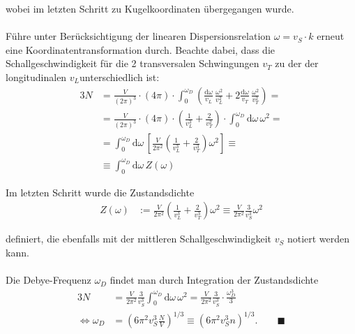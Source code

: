 \documentclass{article}
\newcommand{\diff}{\mathrm{d}}
\newcommand{\lr}[1]{\left(#1\right)}
\newcommand{\lreck}[1]{\left[#1\right]}
\begin{document}
{	wobei im letzten Schritt zu Kugelkoordinaten übergegangen wurde.\\
	\\
	Führe unter Berücksichtigung der linearen Dispersionsrelation $\omega = v_S \cdot k$ erneut eine Koordinatentransformation durch. Beachte dabei, dass die Schallgeschwindigkeit für die 2 transversalen Schwingungen $v_T$ zu der der longitudinalen $v_L$unterschiedlich ist:
		\begin{align*}
			3N &= \frac{V}{(2\pi)^3} \cdot (4\pi) \cdot \int_0^{\omega_D} \lr{ \frac{\diff\omega}{v_L} \, \frac{\omega^2}{v_L^2} + 2 \frac{\diff\omega}{v_T} \, \frac{\omega^2}{v_T^2} } = \\
			&= \frac{V}{(2\pi)^3} \cdot (4\pi) \cdot \lr{ \frac{1}{v_L^3} + \frac{2}{v_T^2} } \cdot \int_0^{\omega_D} \diff\omega \, \omega^2 = \\
			&= \int_0^{\omega_D} \diff\omega \, \lreck{ \frac{V}{2\pi^2} \lr{ \frac{1}{v_L^3} + \frac{2}{v_T^3} } \omega^2 } \equiv \\
			&\equiv \int_0^{\omega_D} \diff\omega \, Z(\omega)
		\end{align*}
	
	Im letzten Schritt wurde die Zustandsdichte
		\begin{align*}
			Z(\omega) &:= \frac{V}{2\pi^2} \lr{ \frac{1}{v_L^3} + \frac{2}{v_T^3} } \omega^2 \equiv \frac{V}{2\pi^2} \frac{3}{v_S^3} \omega^2
		\end{align*}
	
	definiert, die ebenfalls mit der mittleren Schallgeschwindigkeit $v_S$ notiert werden kann.\\
	\\
	Die Debye-Frequenz $\omega_D$ findet man durch Integration der Zustandsdichte
		\begin{align*}
			3N &= \frac{V}{2\pi^2}\frac{3}{v_S^3} \int_0^{\omega_D} \diff\omega \, \omega^2 = \frac{V}{2\pi^2}\frac{3}{v_S^3} \cdot \frac{\omega_D^3}{3} \\
			\Leftrightarrow \omega_D &= \lr{ 6\pi^2 v_S^3 \frac{N}{V} }^{1/3} \equiv (6\pi^2 v_S^3 n)^{1/3}. \qquad \blacksquare
		\end{align*}

}
\end{document}
